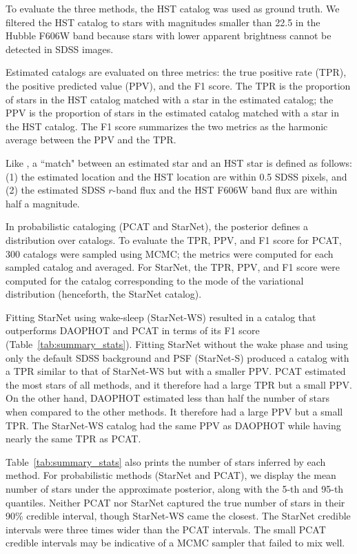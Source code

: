 To evaluate the three methods, the HST catalog was used as ground truth. 
We filtered the HST catalog to stars with magnitudes smaller than 22.5 in the Hubble F606W band because stars with lower apparent brightness cannot be detected in SDSS images. 


Estimated catalogs are evaluated on three metrics: the true positive rate (TPR), the positive predicted value (PPV), and the F1 score. The TPR is the proportion of stars in the HST catalog matched with a star in the estimated catalog;
the PPV is the proportion of stars in the estimated catalog matched with a star in the HST catalog. The F1 score summarizes the two metrics as the harmonic average between the PPV and the TPR.

Like \cite{Portillo_2017, Feder_2019}, a ``match" between an estimated star and an HST star is defined as follows: (1) the estimated location and the HST location are within 0.5 SDSS pixels, and (2) the estimated SDSS $r$-band flux and the HST F606W band flux are within half a magnitude. 

In probabilistic cataloging (PCAT and StarNet), the posterior defines a distribution over catalogs. 
To evaluate the TPR, PPV, and F1 score for PCAT, 300 catalogs were sampled using MCMC; the metrics were computed for each sampled catalog and averaged. 
For StarNet, the TPR, PPV, and F1 score were computed for the catalog corresponding to the mode of the variational distribution (henceforth, the StarNet catalog). 


Fitting StarNet using wake-sleep (StarNet-WS) resulted in a catalog that outperforms DAOPHOT and PCAT in terms of its F1 score (Table~\ref{tab:summary_stats}). 
Fitting StarNet without the wake phase
and using only the default SDSS background and PSF (StarNet-S) produced a catalog with a TPR similar to that of StarNet-WS but with a smaller PPV.
PCAT estimated the most stars of all methods, and it therefore had a large TPR but a small PPV. 
On the other hand, DAOPHOT estimated less than half the number of stars when compared to the other methods. It therefore had a large PPV but a small TPR. 
The StarNet-WS catalog had the same PPV as DAOPHOT while having nearly the same TPR as PCAT. 

Table~\ref{tab:summary_stats} also prints the number of stars inferred by each method. 
For probabilistic methods (StarNet and PCAT), we display the mean number of stars under the approximate posterior, along with the 5-th and 95-th quantiles. 
Neither PCAT nor StarNet captured the true number of stars in their 90\% credible interval, though StarNet-WS came the closest. 
The StarNet credible intervals were three times wider than the PCAT intervals.
The small PCAT credible intervals may be indicative of a MCMC sampler that failed to mix well. 

